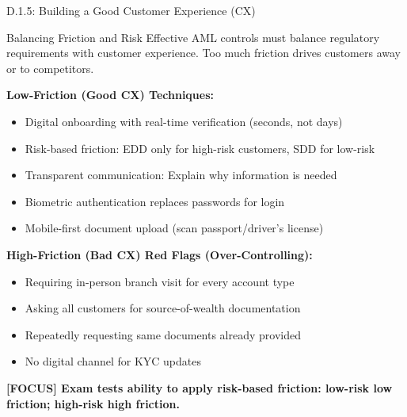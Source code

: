 \documentclass[11pt,a4paper]{beamer}
\newcommand{\examfocus}[1]{\textcolor{orange!80!black}{\textbf{[FOCUS] #1}}}
\begin{document}
\begin{frame}{D.1.5: Building a Good Customer Experience (CX)}
	\begin{block}{Balancing Friction and Risk}
		Effective AML controls must balance regulatory requirements with customer experience. Too much friction drives customers away or to competitors.
	\end{block}
	\textbf{Low-Friction (Good CX) Techniques:}
	\begin{itemize}
		\item Digital onboarding with real-time verification (seconds, not days)
		\item Risk-based friction: EDD only for high-risk customers, SDD for low-risk
		\item Transparent communication: Explain why information is needed
		\item Biometric authentication replaces passwords for login
		\item Mobile-first document upload (scan passport/driver's license)
	\end{itemize}
	\textbf{High-Friction (Bad CX) Red Flags (Over-Controlling):}
	\begin{itemize}
		\item Requiring in-person branch visit for every account type
		\item Asking all customers for source-of-wealth documentation
		\item Repeatedly requesting same documents already provided
		\item No digital channel for KYC updates
	\end{itemize}
	\examfocus{Exam tests ability to apply risk-based friction: low-risk  low friction; high-risk  high friction.}
\end{frame}
\end{document}
